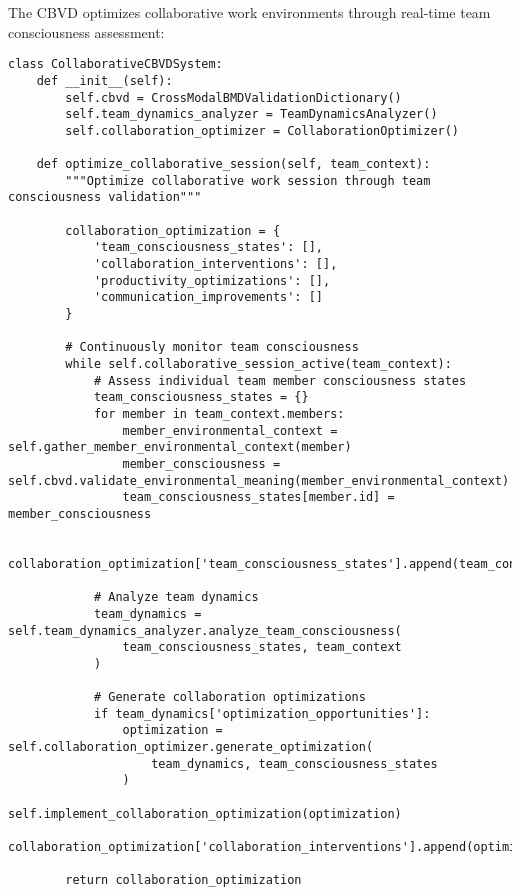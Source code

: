 \documentclass[12pt,a4paper]{article}
\begin{document}
The CBVD optimizes collaborative work environments through real-time team consciousness assessment:

\begin{lstlisting}[style=pythonstyle, caption=Collaborative Work CBVD Application]
class CollaborativeCBVDSystem:
    def __init__(self):
        self.cbvd = CrossModalBMDValidationDictionary()
        self.team_dynamics_analyzer = TeamDynamicsAnalyzer()
        self.collaboration_optimizer = CollaborationOptimizer()
        
    def optimize_collaborative_session(self, team_context):
        """Optimize collaborative work session through team consciousness validation"""
        
        collaboration_optimization = {
            'team_consciousness_states': [],
            'collaboration_interventions': [],
            'productivity_optimizations': [],
            'communication_improvements': []
        }
        
        # Continuously monitor team consciousness
        while self.collaborative_session_active(team_context):
            # Assess individual team member consciousness states
            team_consciousness_states = {}
            for member in team_context.members:
                member_environmental_context = self.gather_member_environmental_context(member)
                member_consciousness = self.cbvd.validate_environmental_meaning(member_environmental_context)
                team_consciousness_states[member.id] = member_consciousness
            
            collaboration_optimization['team_consciousness_states'].append(team_consciousness_states)
            
            # Analyze team dynamics
            team_dynamics = self.team_dynamics_analyzer.analyze_team_consciousness(
                team_consciousness_states, team_context
            )
            
            # Generate collaboration optimizations
            if team_dynamics['optimization_opportunities']:
                optimization = self.collaboration_optimizer.generate_optimization(
                    team_dynamics, team_consciousness_states
                )
                self.implement_collaboration_optimization(optimization)
                collaboration_optimization['collaboration_interventions'].append(optimization)
        
        return collaboration_optimization
\end{lstlisting}
\end{document}
